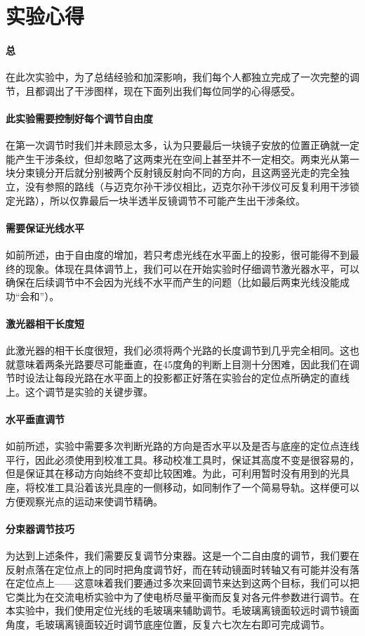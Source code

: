 \documentclass[10pt]{ctexart}
\begin{document}
\section{实验心得}
\paragraph{总}在此次实验中，为了总结经验和加深影响，我们每个人都独立完成了一次完整的调节，且都调出了干涉图样，现在下面列出我们每位同学的心得感受。
\paragraph{此实验需要控制好每个调节自由度}在第一次调节时我们并未顾忌太多，认为只要最后一块镜子安放的位置正确就一定能产生干涉条纹，但却忽略了这两束光在空间上甚至并不一定相交。两束光从第一块分束镜分开后就分别被两个反射镜反射向不同的方向，且这两竖光走的完全独立，没有参照的路线（与迈克尔孙干涉仪相比，迈克尔孙干涉仪可反复利用干涉锁定光路），所以仅靠最后一块半透半反镜调节不可能产生出干涉条纹。
\paragraph{需要保证光线水平}如前所述，由于自由度的增加，若只考虑光线在水平面上的投影，很可能得不到最终的现象。体现在具体调节上，我们可以在开始实验时仔细调节激光器水平，可以确保在后续调节中不会因为光线不水平而产生的问题（比如最后两束光线没能成功“会和”）。
\paragraph{激光器相干长度短}此激光器的相干长度很短，我们必须将两个光路的长度调节到几乎完全相同。这也就意味着两条光路要尽可能垂直，在45度角的判断上目测十分困难，因此我们在调节时设法让每段光路在水平面上的投影都正好落在实验台的定位点所确定的直线上。这个调节是实验的关键步骤。
\paragraph{水平垂直调节}如前所述，实验中需要多次判断光路的方向是否水平以及是否与底座的定位点连线平行，因此必须使用到校准工具。移动校准工具时，保证其高度不变是很容易的，但是保证其在移动方向始终不变却比较困难。为此，可利用暂时没有用到的光具座，将校准工具沿着该光具座的一侧移动，如同制作了一个简易导轨。这样便可以方便观察光点的运动来使调节精确。
\paragraph{分束器调节技巧}为达到上述条件，我们需要反复调节分束器。这是一个二自由度的调节，我们要在反射点落在定位点上的同时把角度调节好，而在转动镜面时转轴又有可能并没有落在定位点上——这意味着我们要通过多次来回调节来达到这两个目标，我们可以把它类比为在交流电桥实验中为了使电桥尽量平衡而反复对各元件参数进行调节。在本实验中，我们使用定位光线的毛玻璃来辅助调节。毛玻璃离镜面较远时调节镜面角度，毛玻璃离镜面较近时调节底座位置，反复六七次左右即可完成调节。
\end{document}
